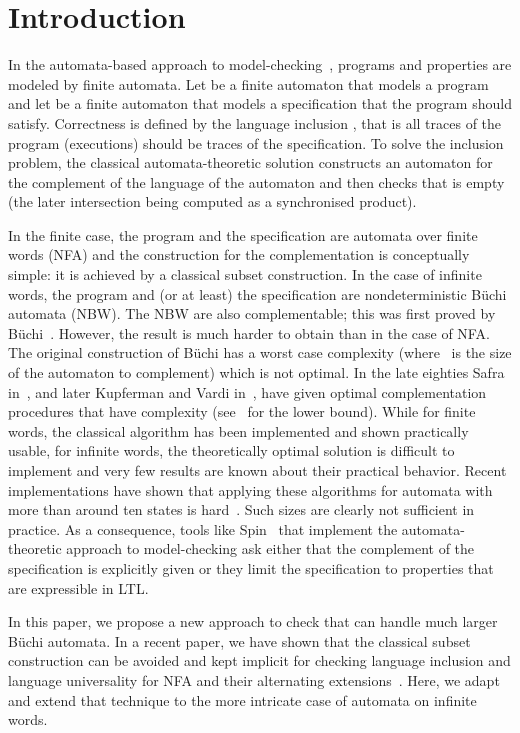 \documentclass{LMCS}
\begin{document}
\section{Introduction}

In the automata-based approach to model-checking~\cite{vw86,vw94},
programs and properties are modeled by finite automata. Let  be a
finite automaton that models a program and let  be a finite
automaton that models a specification that the program should satisfy.
Correctness is defined by the language inclusion ,
that is all traces of the program (executions) should be traces of the
specification.  To solve the inclusion problem, the classical automata-theoretic 
solution constructs an automaton for  the complement of
the language of the automaton  and then checks
that  is empty (the later intersection being
computed as a synchronised product).  

In the finite case, the program and the specification are
automata over finite words (NFA) and the construction for the
complementation is conceptually simple: it is achieved by a classical
subset construction.  In the case of infinite words, the program and
(or at least) the specification are nondeterministic B\"uchi automata
(NBW). The NBW are also complementable; this was first proved
by B\"uchi~\cite{buechi62}.  However, the result is
much harder to obtain than in the case of NFA.  The original
construction of B\"uchi has a  worst case complexity (where~ 
is the size of the automaton to complement) which is not optimal.
In the late eighties Safra in~\cite{Safra88}, and later Kupferman and
Vardi in~\cite{kupferman97weak}, have given optimal complementation
procedures that have  complexity (see~\cite{Michel88} for the
lower bound).  While for finite words, the classical algorithm
has been implemented and shown practically usable, for infinite
words, the theoretically optimal solution is difficult to
implement and very few results are known about their practical
behavior. 
Recent implementations have shown that applying these algorithms for automata 
with more than around ten states is hard~\cite{TabakovV07,GurumurthyKSV03}.
Such sizes are clearly not sufficient in practice. 
As a consequence, tools like {\sc Spin}~\cite{spin} that
implement the automata-theoretic approach to model-checking ask
either that the complement of the specification is explicitly given
or they limit the specification to properties that are expressible in {\sc LTL}.

In this paper, we propose a new approach to check  
that can handle much larger B\"uchi automata. In a recent paper, 
we have shown that the classical subset construction can
be avoided and kept implicit for checking language inclusion and
language universality for NFA and their alternating extensions~\cite{cav06}. 
Here, we adapt and extend that technique to the more intricate case of
automata on infinite words.
\end{document}
